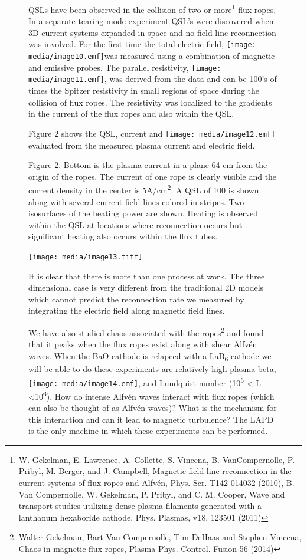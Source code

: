 \documentclass[11pt]{article}
\begin{document}
\begin{description}
\begin{figure}[!htbp]
QSLs have been observed in the collision of two or more\footnote{W.
  Gekelman, E. Lawrence, A. Collette, S. Vincena, B. VanCompernolle, P.
  Pribyl, M. Berger, and J. Campbell, Magnetic field line reconnection
  in the current systems of flux ropes and Alfvén, Phys. Scr. T142
  014032 (2010), B. Van Compernolle, W. Gekelman, P. Pribyl, and C. M.
  Cooper, Wave and transport studies utilizing dense plasma filaments
  generated with a lanthanum hexaboride cathode, Phys. Plasmas, v18,
  123501 (2011)} flux ropes. In a separate tearing mode experiment QSL's
were discovered when 3D current systems expanded in space and no field
line reconnection was involved. For the first time the total electric
field, \texttt{[image: media/image10.emf]}was measured using a
combination of magnetic and emissive probes. The parallel resistivity,
\texttt{[image: media/image11.emf]}, was derived from the data and can
be 100's of times the Spitzer resistivity in small regions of space
during the collision of flux ropes. The resistivity was localized to the
gradients in the current of the flux ropes and also within the QSL.

Figure 2 shows the QSL, current and \texttt{[image: media/image12.emf]}
evaluated from the measured plasma current and electric field.

Figure 2. Bottom is the plasma current in a plane 64 cm from the origin
of the ropes. The current of one rope is clearly visible and the current
density in the center is 5A/cm\textsuperscript{2}. A QSL of 100 is shown
along with several current field lines colored in stripes. Two
isosurfaces of the heating power are shown. Heating is observed within
the QSL at locations where reconnection occurs but significant heating
also occurs within the flux tubes.

\texttt{[image: media/image13.tiff]}

It is clear that there is more than one process at work. The three
dimensional case is very different from the traditional 2D models which
cannot predict the reconnection rate we measured by integrating the
electric field along magnetic field lines.

We have also studied chaos associated with the ropes\footnote{Walter
  Gekelman, Bart Van Compernolle, Tim DeHaas and Stephen Vincena, Chaos
  in magnetic flux ropes, Plasma Phys. Control. Fusion 56 (2014)} and
found that it peaks when the flux ropes exist along with shear Alfvén
waves. When the BaO cathode is relapced with a LaB\textsubscript{6}
cathode we will be able to do these experiments are relatively high
plasma beta, \texttt{[image: media/image14.emf]}, and Lundquist number
(10\textsuperscript{5} \textless{} L \textless{}10\textsuperscript{6}).
How do intense Alfvén waves interact with flux ropes (which can also be
thought of as Alfvén waves)? What is the mechanism for this interaction
and can it lead to magnetic turbulence? The LAPD is the only machine in
which these experiments can be performed.


\end{figure}
\end{description}
\end{document}
